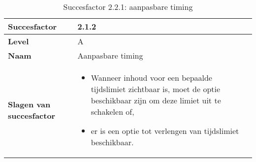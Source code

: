 \begin{table}[H]
    \centering
    \caption{Succesfactor 2.2.1: aanpasbare timing}
    
    
    \hspace*{-1cm}\begin{tabular}{|l|p{12cm}|} 
        \hline
        \textbf{Succesfactor}                 & 2.1.2                                                                                                                                                                                                                                                                                                                                                                                                                                                                                                          \\ 
        \hline
        \textbf{Level}                        & A                                                                                                                                                                                                                                                                                                                                                                                                                                                                                                                 \\ 
        \hline
        \textbf{Naam}                         & Aanpasbare timing~                                                                                                                                                                                                                                                                                                                                                                                                                                                                                      \\ 
        \hline
        \textbf{Slagen van succesfactor}      & \begin{itemize}
            \item Wanneer inhoud voor een bepaalde tijdslimiet zichtbaar is, moet de optie beschikbaar zijn om deze limiet uit te schakelen of,
            \item er is een optie tot verlengen van tijdslimiet beschikbaar.
        \end{itemize}                                                                                                                                                                   \\ 

\end{tabular}
\end{table}
